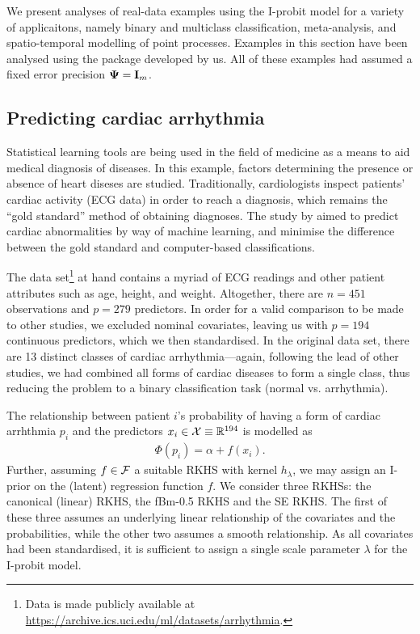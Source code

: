 \documentclass[a4paper,showframe,11pt]{report}\usepackage[]{graphicx}\usepackage[]{color}
\begin{document}
We present analyses of real-data examples using the I-probit model for a variety of applicaitons, namely binary and multiclass classification, meta-analysis, and spatio-temporal modelling of point processes.
Examples in this section have been analysed using the  package  developed by us.
All of these examples had assumed a fixed error precision ${\bm\Psi} = {\mathbf I}_m$.

\subsection{Predicting cardiac arrhythmia}

Statistical learning tools are being used in the field of medicine as a means to aid medical diagnosis of diseases.
In this example, factors determining the presence or absence of heart diseses are studied.
Traditionally, cardiologists inspect patients' cardiac activity (ECG data) in order to reach a diagnosis, which remains the ``gold standard'' method of obtaining diagnoses.
The study by \citet{guvenir1997supervised} aimed to predict cardiac abnormalities by way of machine learning, and minimise the difference between the gold standard and computer-based classifications.

The data set\footnote{Data is made publicly available at \url{https://archive.ics.uci.edu/ml/datasets/arrhythmia}.} at hand contains a myriad of ECG readings and other patient attributes such as age, height, and weight.
Altogether, there are $n=451$ observations and $p=279$ predictors.
In order for a valid comparison to be made to other studies, we excluded nominal covariates, leaving us with $p=194$ continuous predictors, which we then standardised.
In the original data set, there are 13 distinct classes of cardiac arrhythmia---again, following the lead of other studies, we had combined all forms of cardiac diseases to form a single class, thus reducing the problem to a binary classification task (normal vs. arrhythmia).

The relationship between patient $i$'s probability of having a form of cardiac arrhthmia $p_i$ and the predictors $x_i\in{\mathcal X} \equiv \mathbb{R}^{194}$ is modelled as
\begin{gather*}
  \Phi(p_i) = \alpha + f(x_i).
\end{gather*}
Further, assuming $f\in{\mathcal F}$ a suitable RKHS with kernel $h_\lambda$, we may assign an I-prior on the (latent) regression function $f$.
We consider three RKHSs: the canonical (linear) RKHS, the fBm-0.5 RKHS and the SE RKHS.
The first of these three assumes an underlying linear relationship of the covariates and the probabilities, while the other two assumes a smooth relationship.
As all covariates had been standardised, it is sufficient to assign a single scale parameter $\lambda$ for the I-probit model.
\end{document}
